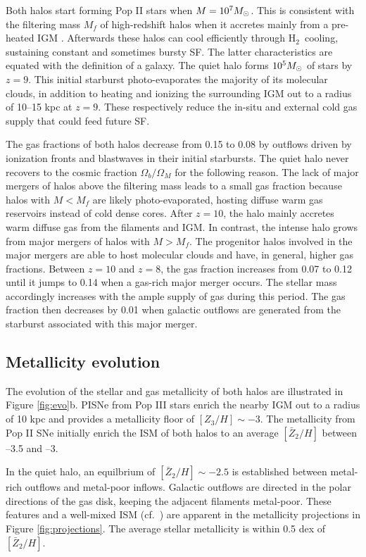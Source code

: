 \documentclass[12pt]{article}
\newcommand{\hh}{H$_2$}
\newcommand{\Ms}{\ifmmode{M_\odot}\else{$M_\odot$}\fi}
\begin{document}
Both halos start forming Pop II stars when $M = 10^7 \Ms$.  This is
consistent with the filtering mass $M_f$ of high-redshift halos when
it accretes mainly from a pre-heated IGM \cite{gnedin98, gnedin00,
  Wise08_Gal}.  Afterwards these halos can cool efficiently through
\hh~cooling, sustaining constant and sometimes bursty SF.  The latter
characteristics are equated with the definition of a galaxy.  The
quiet halo forms $10^5 \Ms$ of stars by $z=9$.  This initial starburst
photo-evaporates the majority of its molecular clouds, in addition to
heating and ionizing the surrounding IGM out to a radius of 10--15 kpc
at $z=9$.  These respectively reduce the in-situ and external cold gas
supply that could feed future SF.

The gas fractions of both halos decrease from 0.15 to 0.08 by outflows
driven by ionization fronts and blastwaves in their initial
starbursts.  The quiet halo never recovers to the cosmic fraction
$\Omega_b/\Omega_M$ for the following reason.  The lack of major
mergers of halos above the filtering mass leads to a small gas
fraction because halos with $M < M_f$ are likely photo-evaporated,
hosting diffuse warm gas reservoirs instead of cold dense cores.
After $z=10$, the halo mainly accretes warm diffuse gas from the
filaments and IGM.  In contrast, the intense halo grows from major
mergers of halos with $M > M_f$.  The progenitor halos involved in the
major mergers are able to host molecular clouds and have, in general,
higher gas fractions.  Between $z=10$ and $z=8$, the gas fraction
increases from 0.07 to 0.12 until it jumps to 0.14 when a gas-rich
major merger occurs.  The stellar mass accordingly increases with the
ample supply of gas during this period.  The gas fraction then
decreases by 0.01 when galactic outflows are generated from the
starburst associated with this major merger.

\subsection*{Metallicity evolution}
\label{sec:zevo}

The evolution of the stellar and gas metallicity of both halos are
illustrated in Figure \ref{fig:evo}b.  PISNe from Pop III stars enrich
the nearby IGM out to a radius of 10 kpc and provides a metallicity
floor of $[Z_3/H] \sim -3$.  The metallicity from Pop II SNe initially
enrich the ISM of both halos to an average $[\bar{Z}_2/H]$ between
--3.5 and --3.  

In the quiet halo, an equilbrium of $[\bar{Z}_2/H] \sim -2.5$ is
established between metal-rich outflows and metal-poor inflows.
Galactic outflows are directed in the polar directions of the gas
disk, keeping the adjacent filaments metal-poor.  These features and a
well-mixed ISM (cf.~\cite{Wise08_Gal, Greif10}) are apparent in the
metallicity projections in Figure \ref{fig:projections}.  The average
stellar metallicity is within 0.5 dex of $[\bar{Z}_2/H]$.
\end{document}
